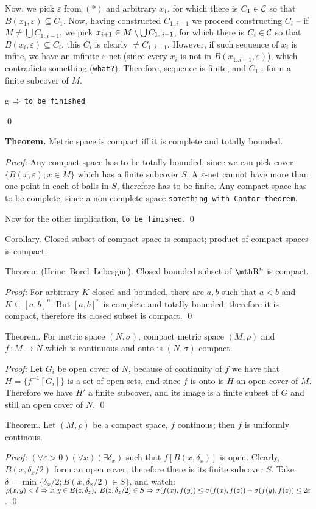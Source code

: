 Now, we pick $\varepsilon$ from $(*)$ and arbitrary $x_1$, for which there
is $C_1 \in \cal C$ so that $B(x_1,\varepsilon)\subseteq C_1$. Now, having 
constructed $C_{1..i-1}$ we proceed constructing $C_i$ -- if $M\neq \bigcup
C_{1..i-1}$, we pick $x_{i+1} \in M\setminus \bigcup C_{1..i-1}$, for which there 
is $C_i \in \cal C$ so that $B(x_i,\varepsilon)\subseteq C_i$, this $C_i$ 
is clearly $\neq C_{1..i-1}$. However, if such sequence of $x_i$ is infite, 
we have an infinite $\varepsilon$-net (since every $x_i$ is not in 
$B(x_{1..i-1},\varepsilon)$), which contradicts something ({\tt what?}). 
Therefore, sequence is finite, and $C_{1..i}$ form a finite subcover of $M$.

\smallskip

g $\Rightarrow$ {\tt to be finished}

\qed
\medskip

{\bf Theorem.} Metric space is compact iff it is complete and totally bounded.

{\it Proof:} Any compact space has to be totally bounded, since we can pick
cover $\{B(x,\varepsilon);x\in M\}$ which has a finite subcover $S$. A
$\varepsilon$-net cannot have more than one point in each of balls in $S$,
therefore has to be finite. Any compact space has to be complete, since a
non-complete space {\tt something with Cantor theorem}.

Now for the other implication, {\tt to be finished}.
\qed

\proclaim Corollary. Closed subset of compact space is compact; product of
compact spaces is compact.

\proclaim Theorem (Heine--Borel--Lebesgue). Closed bounded subset of $\R^n$ is
compact.

{\it Proof:} For arbitrary $K$ closed and bounded, there are $a,b$ such that
$a<b$ and $K\subseteq [a,b]^n$. But $[a,b]^n$ is complete and totally bounded,
therefore it is compact, therefore its closed subset is compact.
\qed

\proclaim Theorem. For metric space $(N,\sigma)$, compact metric space
$(M,\rho)$ and $f\,:M\to N$ which is continuous and onto is $(N,\sigma)$
compact. 

{\it Proof:}
Let $G_i$ be open cover of $N$, because of continuity of $f$ we have that
$H = \{f^{-1}[G_i]\}$ is a set of open sets, and since $f$ is onto is $H$ an
open cover of $M$. Therefore we have $H'$ a finite subcover, and its image is a
finite subset of $G$ and still an open cover of $N$.
\qed

\proclaim Theorem. Let $(M,\rho)$ be a compact space, $f$ continous; then $f$
is uniformly continous.

{\it Proof:} $(\forall \varepsilon>0)(\forall x)(\exists \delta_x)$ such that 
$f[B(x,\delta_x)]$ is open. Clearly, $B(x,\delta_x/2)$ form an open cover,
therefore there is its finite subcover $S$. Take $\delta =
\min\{\delta_x/2;B(x,\delta_x/2)\in S\}$, and watch: $\rho(x,y) < \delta
\Rightarrow x,y \in B(z,\delta_z),\ B(z,\delta_z/2)\in S \Rightarrow \sigma(f(x),f(y))
\leq \sigma(f(x),f(z)) + \sigma(f(y),f(z)) \leq 2\varepsilon$.
\qed
